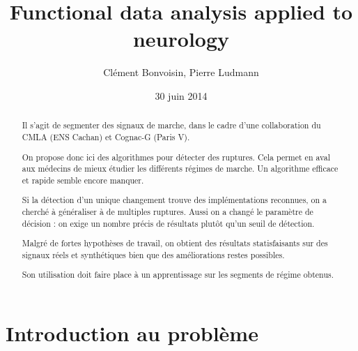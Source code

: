 \documentclass[french,12pt,notitlepage]{report}
\begin{document}
	\title{Functional data analysis applied to neurology}
	\author{Clément Bonvoisin, Pierre Ludmann}
	\date{30 juin 2014}
	\maketitle

	\begin{abstract}
  
Il s'agit de segmenter des signaux de marche,
dans le cadre d'une collaboration du CMLA (ENS Cachan) et Cognac-G (Paris V).

On propose donc ici des algorithmes pour détecter des ruptures.
Cela permet en aval aux médecins de mieux étudier les différents régimes de marche.
Un algorithme efficace et rapide semble encore manquer.

Si la détection d'un unique changement trouve des implémentations reconnues,
on a cherché à généraliser à de multiples ruptures.
Aussi on a changé le paramètre de décision : on exige un nombre précis de résultats plutôt qu'un seuil de détection.

Malgré de fortes hypothèses de travail,
on obtient des résultats statisfaisants sur des signaux réels et synthétiques
bien que des améliorations restes possibles.

Son utilisation doit faire place à un apprentissage sur les segments de régime obtenus.

	\end{abstract}

	\tableofcontents

	\chapter{Introduction au problème}
\end{document}
